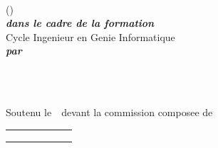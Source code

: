 \begin{titlepage}
\begin{center}
\vspace{10pt}
\ENIS{}\\
(\studyDepartment)\\

\vspace{30pt}
\textbf{\textit{dans le cadre de la formation}}\\

\vspace{10pt}
Cycle Ingenieur en Genie Informatique\\

\vspace{30pt}
\textbf{\textit{par}}\\
\vspace{10pt} {%
  \fontsize{18pt}{18pt}\selectfont%
  \textbf{\reportAuthor}\\
}%

\vspace{10pt} {%
  \renewcommand*{\familydefault}{\defaultFont}
  \fontsize{27pt}{27pt}\selectfont%
  \HRule%
  \vspace{10pt}
  \reportSubject{}\\%
  \vspace{10pt}
  \HRule%
}

\vspace{10pt}
Soutenu le~\dateSoutenance~devant la commission composee de\\
\vspace{20pt}
\begin{tabular}{p{0.3\linewidth} p{0.15\linewidth}}
  \juryPresident{} & \juryPresidentDesc{}\\
  \juryMemberOne{} & \juryMemberOneDesc{}\\
  \juryMemberTwo{} & \juryMemberTwoDesc{}\\
\end{tabular}

\vfill

\end{center}
\end{titlepage}
